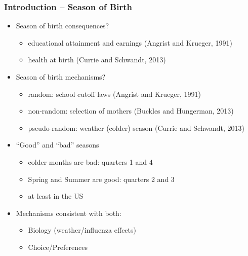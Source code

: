 \documentclass[10pt,letterpaper,subeqn]{beamer}
\begin{document}
\begin{frame}
\frametitle{Introduction -- Season of Birth}
\begin{itemize}
\item Season of birth consequences?
\begin{itemize}
\item educational attainment and earnings (Angrist and Krueger, 1991)
\item health at birth (Currie and Schwandt, 2013)
\end{itemize}
\item Season of birth mechanisms?
\begin{itemize}
\item random: school cutoff laws (Angrist and Krueger, 1991)
\item non-random: selection of mothers (Buckles and Hungerman, 2013)
\item pseudo-random: weather (colder) season (Currie and Schwandt, 2013)
\end{itemize}
\item ``Good'' and ``bad'' seasons
\begin{itemize}
\item colder months are bad: quarters 1 and 4
\item Spring and Summer are good: quarters 2 and 3
\item at least in the US
\end{itemize}
\item Mechanisms consistent with both: 
\begin{itemize}
\item Biology (weather/influenza effects)
\item Choice/Preferences 
\end{itemize}
\end{itemize}
\end{frame}
\end{document}
